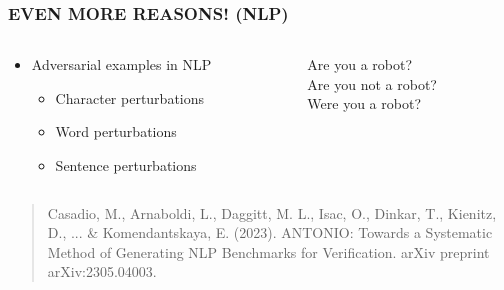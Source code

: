 \documentclass[t,compress,aspectratio=169]{beamer}
\begin{document}
\begin{frame}
\frametitle{EVEN MORE REASONS! (NLP)}

\begin{columns}[c]
    \begin{column}{.5\textwidth}
        \begin{itemize}    \Large

            \item Adversarial examples in NLP
            \begin{itemize}    \Large

                \item Character perturbations
                \item \textcolor{aisecred}{Word perturbations}
                \item Sentence perturbations
            \end{itemize}
        \end{itemize}
    \end{column}
    \begin{column}{.5\textwidth}
    \begin{center}    \Large

        \textcolor{aisecpurple}{Are you a robot?}\\
        \textcolor{aisecpurple}{Are you }\textcolor{aisecred}{not }\textcolor{aisecpurple}{a robot?}\\
        \textcolor{aisecred}{Were }\textcolor{aisecpurple}{you a robot?}
    \end{center}
    \end{column}
\end{columns}
\vfill
	\begin{quote}
		\tiny Casadio, M., {{Arnaboldi, L.}}, Daggitt, M. L., Isac, O., Dinkar, T., Kienitz, D., ... \& Komendantskaya, E. (2023). ANTONIO: Towards a Systematic Method of Generating NLP Benchmarks for Verification. arXiv preprint arXiv:2305.04003.

	\end{quote}
\end{frame}
\end{document}
